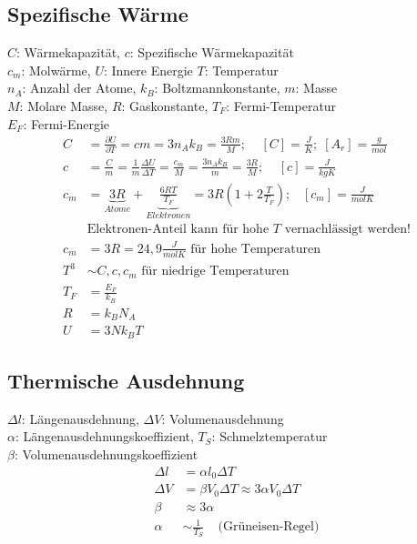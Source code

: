\documentclass[a4paper,twocolumn,10pt]{article}
\begin{document}
\subsection{Spezifische Wärme}
$C$: Wärmekapazität, $c$: Spezifische Wärmekapazität\\
$c_m$: Molwärme, $U$: Innere Energie $T$: Temperatur\\
$n_A$: Anzahl der Atome, $k_B$: Boltzmannkonstante, $m$: Masse\\
$M$: Molare Masse, $R$: Gaskonstante, $T_F$: Fermi-Temperatur\\
$E_F$: Fermi-Energie
\begin{equation*}
\begin{split}
C&=\frac{\partial U}{\partial T}=cm=3n_Ak_B=\frac{3Rm}{M};\;\;\;\;[C]=\frac{J}{K};\;[A_r]=\frac{g}{mol}\\
c&=\frac{C}{m}=\frac{1}{m}\frac{\Delta U}{\Delta T}=\frac{c_m}{M}=\frac{3n_Ak_B}{m}=\frac{3R}{M};\;\;\;\;[c]=\frac{J}{kgK}\\
c_m&=\underbrace{3R}_{Atome}+\underbrace{\frac{6RT}{T_F}}_{Elektronen}=3R\left(1+2\frac{T}{T_F}\right);\;\;\;[c_m]=\frac{J}{molK}\\
&\text{Elektronen-Anteil kann für hohe $T$ vernachlässigt werden!}\\
c_m&=3R=24,9\frac{J}{mol K}\text{ für hohe Temperaturen}\\
T^3&\sim C,c,c_m\text{ für niedrige Temperaturen}\\
T_F&=\frac{E_F}{k_B}\\
R&=k_BN_A\\
U&=3Nk_BT
\end{split}
\end{equation*}

\subsection{Thermische Ausdehnung}
$\Delta l$: Längenausdehnung, $\Delta V$: Volumenausdehnung\\
$\alpha$: Längenausdehnungskoeffizient, $T_S$: Schmelztemperatur\\
$\beta$: Volumenausdehnungskoeffizient
\begin{equation*}
\begin{split}
\Delta l&=\alpha l_0\Delta T\\
\Delta V&=\beta V_0\Delta T\approx 3\alpha V_0\Delta T\\
\beta&\approx 3\alpha\\
\alpha&\sim\frac{1}{T_S}\;\;\;\;\text{(Grüneisen-Regel)}
\end{split}
\end{equation*}
\end{document}
